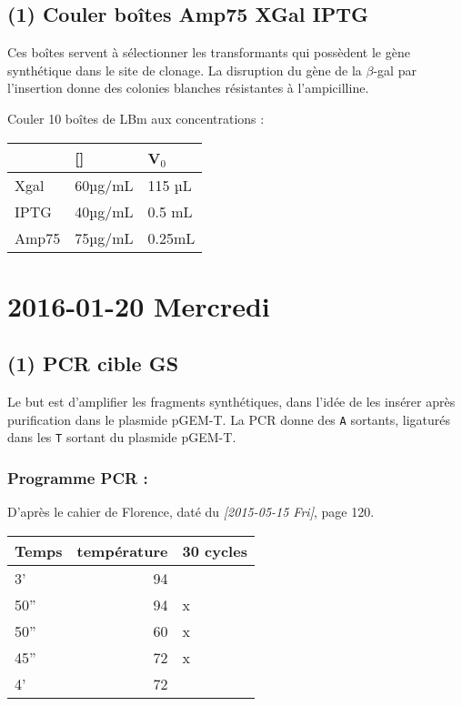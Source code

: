 \documentclass[9pt, oneside, twocolumn]{scrartcl}
\begin{document}
\subsection{(1) Couler boîtes Amp75 XGal IPTG}
\label{sec:orgheadline57}
Ces boîtes servent à sélectionner les transformants qui possèdent le gène
synthétique dans le site de clonage. La disruption du gène de la \(\beta\)-gal par
l'insertion donne des colonies blanches résistantes à l'ampicilline.

Couler 10 boîtes de LBm aux concentrations :
\begin{center}
\begin{tabular}{lll}
\toprule
 & [] & V\(_{\text{0}}\)\\
\midrule
Xgal & 60µg/mL & 115 µL\\
IPTG & 40µg/mL & 0.5 mL\\
Amp75 & 75µg/mL & 0.25mL\\
\bottomrule
\end{tabular}
\end{center}

\section{2016-01-20 Mercredi}
\label{sec:orgheadline69}
\subsection{(1) PCR cible GS}
\label{sec:orgheadline62}
Le but est d'amplifier les fragments synthétiques, dans l'idée de les insérer
après purification dans le plasmide pGEM-T. La PCR donne des \texttt{A} sortants,
ligaturés dans les \texttt{T} sortant du plasmide pGEM-T. 

\subsubsection{Programme PCR :}
\label{sec:orgheadline59}
D'après le cahier de Florence, daté du \textit{[2015-05-15 Fri]}, page 120. 
\begin{center}
\begin{tabular}{lrl}
\toprule
Temps & température & 30 cycles\\
\midrule
3' & 94 & \\
50'' & 94 & x\\
50'' & 60 & x\\
45'' & 72 & x\\
4' & 72 & \\
\bottomrule
\end{tabular}
\end{center}
\end{document}
